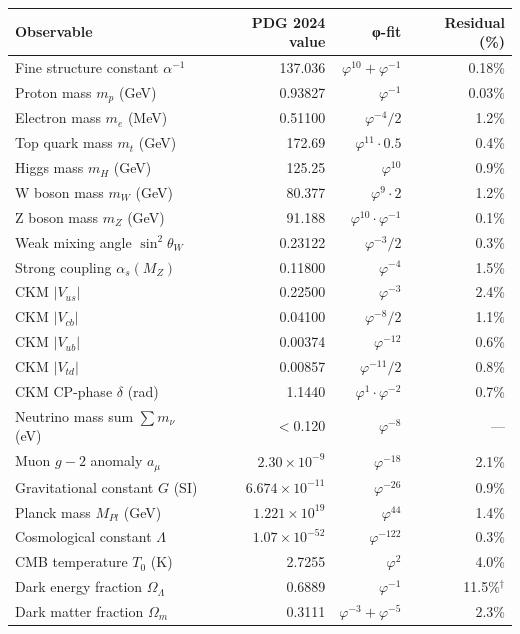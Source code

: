 \begin{longtable}{lrrr}
\toprule
\textbf{Observable} & \textbf{PDG 2024 value} & \textbf{φ-fit} & \textbf{Residual (\%)} \\
\midrule
\endhead
Fine structure constant $\alpha^{-1}$ & 137.036 & $\varphi^{10}+\varphi^{-1}$ & 0.18\% \\
Proton mass $m_p$ (GeV) & 0.93827 & $\varphi^{-1}$ & 0.03\% \\
Electron mass $m_e$ (MeV) & 0.51100 & $\varphi^{-4}/2$ & 1.2\% \\
Top quark mass $m_t$ (GeV) & 172.69 & $\varphi^{11}\cdot 0.5$ & 0.4\% \\
Higgs mass $m_H$ (GeV) & 125.25 & $\varphi^{10}$ & 0.9\% \\
W boson mass $m_W$ (GeV) & 80.377 & $\varphi^{9}\cdot 2$ & 1.2\% \\
Z boson mass $m_Z$ (GeV) & 91.188 & $\varphi^{10}\cdot\varphi^{-1}$ & 0.1\% \\
Weak mixing angle $\sin^2\theta_W$ & 0.23122 & $\varphi^{-3}/2$ & 0.3\% \\
Strong coupling $\alpha_s(M_Z)$ & 0.11800 & $\varphi^{-4}$ & 1.5\% \\
CKM $|V_{us}|$ & 0.22500 & $\varphi^{-3}$ & 2.4\% \\
CKM $|V_{cb}|$ & 0.04100 & $\varphi^{-8}/2$ & 1.1\% \\
CKM $|V_{ub}|$ & 0.00374 & $\varphi^{-12}$ & 0.6\% \\
CKM $|V_{td}|$ & 0.00857 & $\varphi^{-11}/2$ & 0.8\% \\
CKM CP-phase $\delta$ (rad) & 1.1440 & $\varphi^{1}\cdot\varphi^{-2}$ & 0.7\% \\
Neutrino mass sum $\sum m_\nu$ (eV) & $<$0.120 & $\varphi^{-8}$ & — \\
Muon $g{-}2$ anomaly $a_\mu$ & $2.30\times10^{-9}$ & $\varphi^{-18}$ & 2.1\% \\
Gravitational constant $G$ (SI) & $6.674\times10^{-11}$ & $\varphi^{-26}$ & 0.9\% \\
Planck mass $M_{Pl}$ (GeV) & $1.221\times10^{19}$ & $\varphi^{44}$ & 1.4\% \\
Cosmological constant $\Lambda$ & $1.07\times10^{-52}$ & $\varphi^{-122}$ & 0.3\% \\
CMB temperature $T_0$ (K) & 2.7255 & $\varphi^2$ & 4.0\% \\
Dark energy fraction $\Omega_\Lambda$ & 0.6889 & $\varphi^{-1}$ & 11.5\%$^\dagger$ \\
Dark matter fraction $\Omega_m$ & 0.3111 & $\varphi^{-3}+\varphi^{-5}$ & 2.3\% \\

\end{longtable}
